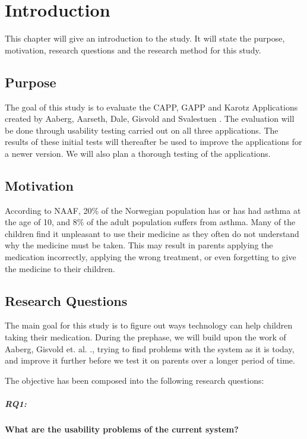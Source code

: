 \chapter{Introduction}
\label{chp:introduction}

This chapter will give an introduction to the study. It will state the purpose, motivation, research questions and the research method for this study. 

\section{Purpose}
\label{sec:purpose}
The goal of this study is to evaluate the CAPP, GAPP and Karotz Applications created by Aaberg, Aarseth, Dale, Gisvold and Svalestuen \cite{CustomerDriven}.
The evaluation will be done through usability testing carried out on all three applications. The results of these initial tests will thereafter be used to improve the applications for a newer version. 
We will also plan a thorough testing of the applications.


\section{Motivation}
\label{sec:motivation}
According to NAAF, 20\% \cite{NAAF} of the Norwegian population has or has had asthma at the age of 10, and 8\% of the adult population suffers from asthma. Many of the children find it unpleasant to use their medicine as they often do not understand why the medicine must be taken. This may result in parents applying the medication incorrectly, applying the wrong treatment, or even forgetting to give the medicine to their children. 


\section{Research Questions}
\label{sec:researchquestions}
The main goal for this study is to figure out ways technology can help children taking their medication. During the prephase, we will build upon the work of Aaberg, Gisvold et. al.  \cite{CustomerDriven}., trying to find problems with the system as it is today, and improve it further before we test it on parents over a longer period of time.  

The objective has been composed into the following research questions: 


\paragraph{RQ1:}
\textbf{What are the usability problems of the current system?}


